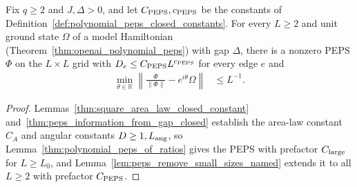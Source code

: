\begin{corollary}
    \label{thm:polynomial_peps_explicit_constants}
    \leanok
    Fix $q\ge2$ and $J,\Delta>0$, and let $C_{\rm PEPS},c_{\rm PEPS}$ be the constants of Definition~\ref{def:polynomial_peps_closed_constants}. For every $L\ge2$ and unit ground state $\Omega$ of a model Hamiltonian (Theorem~\ref{thm:openai_polynomial_peps}) with gap $\Delta$, there is a nonzero PEPS $\Phi$ on the $L\times L$ grid with $D_e\le C_{\rm PEPS}L^{c_{\rm PEPS}}$ for every edge $e$ and
    \begin{align}
        \min_{\theta\in\mathbb R}
        \left\|\frac{\Phi}{\|\Phi\|}-e^{i\theta}\Omega\right\| & \le L^{-1}.
    \end{align}
\end{corollary}
\begin{proof}
    \leanok
    Lemmas~\ref{thm:square_area_law_closed_constant} and~\ref{thm:peps_information_from_gap_closed} establish the area-law constant $C_A$ and angular constants $D\ge1,L_{\rm ang}$, so Lemma~\ref{thm:polynomial_peps_of_ratios} gives the PEPS with prefactor $C_{\rm large}$ for $L\ge L_0$, and Lemma~\ref{lem:peps_remove_small_sizes_named} extends it to all $L\ge2$ with prefactor $C_{\rm PEPS}$.
\end{proof}
